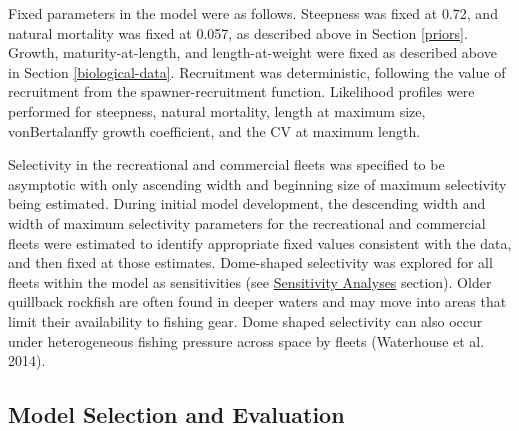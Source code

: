 \documentclass[11pt,
  english,
  letterpaper,
]{article}
\begin{document}
\leavevmode\tagmcend\tagstructend\par


Fixed parameters in the model were as follows. Steepness was fixed at 0.72, and natural mortality was fixed at 0.057, as described above in Section \ref{priors}. Growth, maturity-at-length, and length-at-weight were fixed as described above in Section \ref{biological-data}. Recruitment was deterministic, following the value of recruitment from the spawner-recruitment function. Likelihood profiles were performed for steepness, natural mortality, length at maximum size, vonBertalanffy growth coefficient, and the CV at maximum length.

\leavevmode\tagmcend\tagstructend\par


Selectivity in the recreational and commercial fleets was specified to be asymptotic with only ascending width and beginning size of maximum selectivity being estimated. During initial model development, the descending width and width of maximum selectivity parameters for the recreational and commercial fleets were estimated to identify appropriate fixed values consistent with the data, and then fixed at those estimates. Dome-shaped selectivity was explored for all fleets within the model as sensitivities (see {\protect\hyperlink{sensitivity-analyses}{Sensitivity Analyses}\leavevmode\tagmcend\tagstructend} section). Older quillback rockfish are often found in deeper waters and may move into areas that limit their availability to fishing gear. Dome shaped selectivity can also occur under heterogeneous fishing pressure across space by fleets {(Waterhouse et al. 2014)\leavevmode\tagmcend\tagstructend}.

\leavevmode\tagmcend\tagstructend\par


\hypertarget{model-selection-and-evaluation}{%
\subsection{Model Selection and Evaluation}\label{model-selection-and-evaluation}}

\leavevmode\tagmcend\tagstructend
\end{document}
